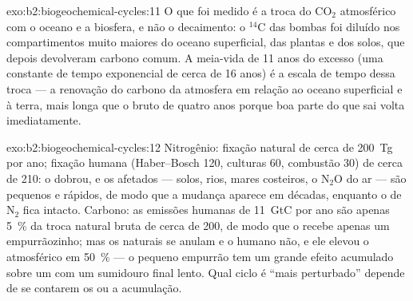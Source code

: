 \begin{solution}{exo:b2:biogeochemical-cycles:11}
O que foi medido é a troca do $\mathrm{CO_2}$ atmosférico com o
oceano e a biosfera, e não o decaimento: o $\mathrm{{}^{14}C}$ das bombas foi
diluído nos compartimentos muito maiores do oceano superficial, das
plantas e dos solos, que depois devolveram carbono comum. A meia-vida de
11 anos do excesso (uma constante de tempo exponencial de cerca de 16 anos) é
a escala de tempo dessa troca --- a renovação do carbono da atmosfera em
relação ao oceano superficial e à terra, mais longa que o  bruto de quatro anos porque boa parte do que sai volta
imediatamente.
\end{solution}

\begin{solution}{exo:b2:biogeochemical-cycles:12}
Nitrogênio: fixação natural de cerca de 200~Tg por ano; fixação humana
(Haber--Bosch 120, culturas 60, combustão 30) de cerca de 210: o 
dobrou, e os  afetados --- solos, rios, mares costeiros, o
$\mathrm{N_2O}$ do ar --- são pequenos e rápidos, de modo que a mudança
aparece em décadas, enquanto o  de $\mathrm{N_2}$ fica intacto.
Carbono: as emissões humanas de 11~GtC por ano são apenas \qty{5}{\%} da
troca natural bruta de cerca de 200, de modo que o  recebe apenas um
empurrãozinho; mas os  naturais se anulam e o humano não, e ele
elevou o  atmosférico em \qty{50}{\%} --- o pequeno empurrão
tem um grande efeito acumulado sobre um  com um sumidouro
final lento. Qual ciclo é ``mais perturbado'' depende de se contarem os
 ou a acumulação.
\end{solution}

